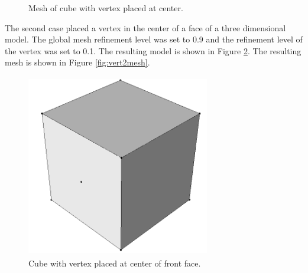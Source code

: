 \documentclass[a4paper, 12pt]{article}
\begin{document}
\begin{figure}[H]
  \centering
  \caption{Mesh of cube with vertex placed at center.}
  \label{fig:vert1mesh}
\end{figure}

The second case placed a vertex in the center of a face of a three dimensional 
model. The global mesh refinement level was set to 0.9 and the refinement
level of the vertex was set to 0.1. 
The resulting model is shown in Figure \ref{fig:vert2model}.
The resulting mesh is shown in Figure \ref{fig:vert2mesh}.

\begin{figure}[H]
  \centering
  \includegraphics[width=8cm, height=8cm]{test4_smd}
  \caption{Cube with vertex placed at center of front face.}
  \label{fig:vert2model}
\end{figure}
\end{document}
